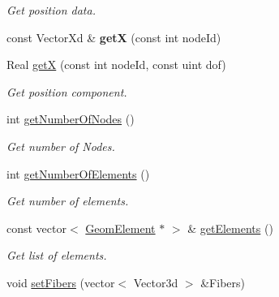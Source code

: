 \begin{DoxyCompactItemize}
\begin{DoxyCompactList}\small\item\em Get position data. \item\end{DoxyCompactList}\item 
\hypertarget{classvoom_1_1_mesh_ae312d18416eb3aad18b386b02b176af8}{
const VectorXd \& {\bfseries getX} (const int nodeId)}
\label{classvoom_1_1_mesh_ae312d18416eb3aad18b386b02b176af8}

\item 
\hypertarget{classvoom_1_1_mesh_a207f6b30add74ee2af1ea99fc2ad6589}{
Real \hyperlink{classvoom_1_1_mesh_a207f6b30add74ee2af1ea99fc2ad6589}{getX} (const int nodeId, const uint dof)}
\label{classvoom_1_1_mesh_a207f6b30add74ee2af1ea99fc2ad6589}

\begin{DoxyCompactList}\small\item\em Get position component. \item\end{DoxyCompactList}\item 
\hypertarget{classvoom_1_1_mesh_aaa003a1d0ebc22f275ab1442384634c0}{
int \hyperlink{classvoom_1_1_mesh_aaa003a1d0ebc22f275ab1442384634c0}{getNumberOfNodes} ()}
\label{classvoom_1_1_mesh_aaa003a1d0ebc22f275ab1442384634c0}

\begin{DoxyCompactList}\small\item\em Get number of Nodes. \item\end{DoxyCompactList}\item 
\hypertarget{classvoom_1_1_mesh_ae6d9ceec1072f438c580b25657ea4423}{
int \hyperlink{classvoom_1_1_mesh_ae6d9ceec1072f438c580b25657ea4423}{getNumberOfElements} ()}
\label{classvoom_1_1_mesh_ae6d9ceec1072f438c580b25657ea4423}

\begin{DoxyCompactList}\small\item\em Get number of elements. \item\end{DoxyCompactList}\item 
\hypertarget{classvoom_1_1_mesh_a80ed078b7dcad577efa215e90029ee44}{
const vector$<$ \hyperlink{classvoom_1_1_geom_element}{GeomElement} $\ast$ $>$ \& \hyperlink{classvoom_1_1_mesh_a80ed078b7dcad577efa215e90029ee44}{getElements} ()}
\label{classvoom_1_1_mesh_a80ed078b7dcad577efa215e90029ee44}

\begin{DoxyCompactList}\small\item\em Get list of elements. \item\end{DoxyCompactList}\item 
\hypertarget{classvoom_1_1_mesh_a85244420c5b19505f93bfe41b9a93c92}{
void \hyperlink{classvoom_1_1_mesh_a85244420c5b19505f93bfe41b9a93c92}{setFibers} (vector$<$ Vector3d $>$ \&Fibers)}
\label{classvoom_1_1_mesh_a85244420c5b19505f93bfe41b9a93c92}


\end{DoxyCompactItemize}
